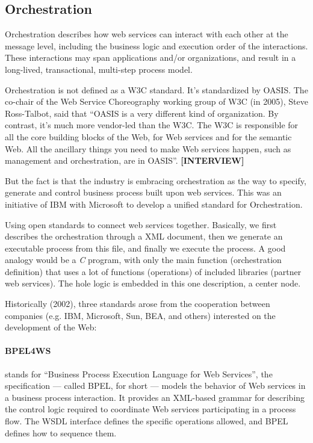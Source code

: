 \documentclass[11pt,a4paper]{article}
\begin{document}
\subsection{Orchestration}
Orchestration describes how web services can interact with each other at the message level, including the business logic and execution order of the interactions. These interactions may span applications and/or organizations, and result in a long-lived, transactional, multi-step process model.

Orchestration is not defined as a W3C standard. It's standardized by OASIS. The co-chair of the Web Service Choreography working group of W3C (in 2005), Steve Ross-Talbot, said that ``OASIS is a very different kind of organization. By contrast, it's much more vendor-led than the W3C. The W3C is responsible for all the core building blocks of the Web, for Web services and for the semantic Web. All the ancillary things you need to make Web services happen, such as management and orchestration, are in OASIS''. \textbf{[INTERVIEW]}

But the fact is that the industry is embracing orchestration as the way to specify, generate and control business process built upon web services. This was an initiative of IBM with Microsoft to develop a unified standard for Orchestration.

Using open standards to connect web services together. Basically, we first describes the orchestration through a XML document, then we generate an executable process from this file, and finally we execute the process. A good analogy would be a \emph{C} program, with only the main function (orchestration definition) that uses a lot of functions (operations) of included libraries (partner web services). The hole logic is embedded in this one description, a center node. 

Historically (2002), three standards arose from the cooperation between companies (e.g. IBM, Microsoft, Sun, BEA, and others) interested on the development of the Web:

\paragraph{BPEL4WS} 
stands for ``Business Process Execution Language for Web Services'', the specification — called BPEL, for short — models the behavior of Web services in a business process interaction. It provides an XML-based grammar for describing the control logic required to coordinate Web services participating in a process flow. The WSDL interface defines the specific operations allowed, and BPEL defines how to sequence them.
\end{document}
